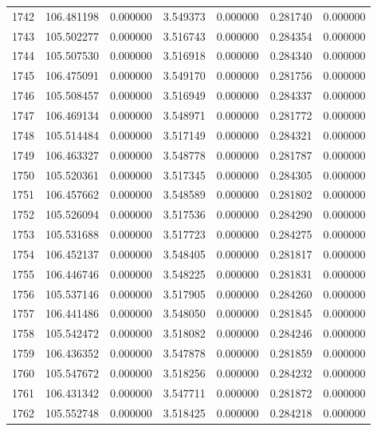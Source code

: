 \begin{tabular}{rrrrrrr}
1742 & 106.481198 &    0.000000 &  3.549373 &    0.000000 &    0.281740 &  0.000000 \\
1743 & 105.502277 &    0.000000 &  3.516743 &    0.000000 &    0.284354 &  0.000000 \\
1744 & 105.507530 &    0.000000 &  3.516918 &    0.000000 &    0.284340 &  0.000000 \\
1745 & 106.475091 &    0.000000 &  3.549170 &    0.000000 &    0.281756 &  0.000000 \\
1746 & 105.508457 &    0.000000 &  3.516949 &    0.000000 &    0.284337 &  0.000000 \\
1747 & 106.469134 &    0.000000 &  3.548971 &    0.000000 &    0.281772 &  0.000000 \\
1748 & 105.514484 &    0.000000 &  3.517149 &    0.000000 &    0.284321 &  0.000000 \\
1749 & 106.463327 &    0.000000 &  3.548778 &    0.000000 &    0.281787 &  0.000000 \\
1750 & 105.520361 &    0.000000 &  3.517345 &    0.000000 &    0.284305 &  0.000000 \\
1751 & 106.457662 &    0.000000 &  3.548589 &    0.000000 &    0.281802 &  0.000000 \\
1752 & 105.526094 &    0.000000 &  3.517536 &    0.000000 &    0.284290 &  0.000000 \\
1753 & 105.531688 &    0.000000 &  3.517723 &    0.000000 &    0.284275 &  0.000000 \\
1754 & 106.452137 &    0.000000 &  3.548405 &    0.000000 &    0.281817 &  0.000000 \\
1755 & 106.446746 &    0.000000 &  3.548225 &    0.000000 &    0.281831 &  0.000000 \\
1756 & 105.537146 &    0.000000 &  3.517905 &    0.000000 &    0.284260 &  0.000000 \\
1757 & 106.441486 &    0.000000 &  3.548050 &    0.000000 &    0.281845 &  0.000000 \\
1758 & 105.542472 &    0.000000 &  3.518082 &    0.000000 &    0.284246 &  0.000000 \\
1759 & 106.436352 &    0.000000 &  3.547878 &    0.000000 &    0.281859 &  0.000000 \\
1760 & 105.547672 &    0.000000 &  3.518256 &    0.000000 &    0.284232 &  0.000000 \\
1761 & 106.431342 &    0.000000 &  3.547711 &    0.000000 &    0.281872 &  0.000000 \\
1762 & 105.552748 &    0.000000 &  3.518425 &    0.000000 &    0.284218 &  0.000000 \\

\end{tabular}
